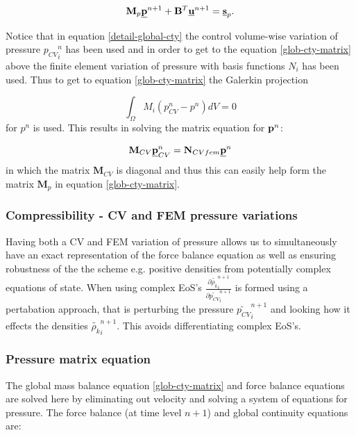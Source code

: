 \begin{equation}
{\mathbf M}_p \underline{\bf p}^{n+1} + {\mathbf B}^T \underline{\bf u}^{n+1} 
= \underline{\bf s}_p. 
\label{glob-cty-matrix}
\end{equation}

Notice that in equation \ref{detail-global-cty} the 
control volume-wise variation of pressure ${p_{CV}}_i^n$ has been 
used and in order to get to the equation  \ref{glob-cty-matrix} 
above the finite element variation of pressure with basis 
functions $N_i$ has been used. Thus to get to equation 
\ref{glob-cty-matrix} the Galerkin projection

\begin{equation}
\int_{\Omega} M_i (p_{CV}^n-p^n) dV =0
\end{equation}
for $p^n$ is used. This results in solving the matrix 
equation for ${\bf p}^n$: 

\begin{equation}
{\mathbf M}_{CV} \underline{\bf p}_{CV}^n = {\mathbf N}_{CVfem} \underline {\bf p}^n
\end{equation}
in which the matrix ${\mathbf M}_{CV}$ is diagonal and thus 
this can easily help form the matrix ${\mathbf M}_p$ in equation 
\ref{glob-cty-matrix}. 

\subsubsection{Compressibility - CV and FEM pressure variations}

Having both a CV and FEM variation of pressure allows us to 
simultaneously have an exact representation of the force balance 
equation as well as ensuring robustness of the the scheme 
e.g. positive densities from potentially complex equations 
of state. When using complex EoS's $\frac{\partial \tilde { \rho_k}_i^{n+1}}{\partial \tilde {p_{CV}}_i^{n+1}}$ is formed 
using a pertabation approach, that is 
perturbing the pressure $\tilde {p_{CV}}_i^{n+1}$ and looking how 
it effects the densities $\tilde {\rho_k}_i^{n+1}$. This 
avoids differentiating complex EoS's. 

				



\subsubsection{Pressure matrix equation} 

The  
global mass balance equation \ref{glob-cty-matrix} and 
force balance equations  are solved here by eliminating  
out velocity and solving a system of equations for 
pressure. 
The force balance (at time level $n+1$) 
and global continuity equations are:

